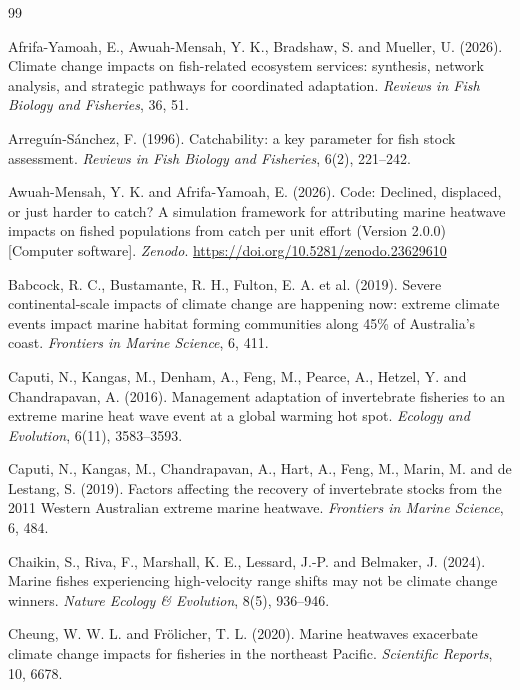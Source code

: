 \documentclass[11pt,a4paper]{article}
\begin{document}
\begin{thebibliography}{99}
\setlength{\itemsep}{2pt}

Afrifa-Yamoah, E., Awuah-Mensah, Y. K., Bradshaw, S. and Mueller, U. (2026). Climate change impacts on fish-related ecosystem services: synthesis, network analysis, and strategic pathways for coordinated adaptation. \textit{Reviews in Fish Biology and Fisheries}, 36, 51.

Arregu\'in-S\'anchez, F. (1996). Catchability: a key parameter for fish stock assessment. \textit{Reviews in Fish Biology and Fisheries}, 6(2), 221--242.

Awuah-Mensah, Y. K. and Afrifa-Yamoah, E. (2026). Code: Declined, displaced, or just harder to catch? A simulation framework for attributing marine heatwave impacts on fished populations from catch per unit effort (Version 2.0.0) [Computer software]. \textit{Zenodo}. \url{https://doi.org/10.5281/zenodo.23629610}

Babcock, R. C., Bustamante, R. H., Fulton, E. A. et al. (2019). Severe continental-scale impacts of climate change are happening now: extreme climate events impact marine habitat forming communities along 45\% of Australia's coast. \textit{Frontiers in Marine Science}, 6, 411.

Caputi, N., Kangas, M., Denham, A., Feng, M., Pearce, A., Hetzel, Y. and Chandrapavan, A. (2016). Management adaptation of invertebrate fisheries to an extreme marine heat wave event at a global warming hot spot. \textit{Ecology and Evolution}, 6(11), 3583--3593.

Caputi, N., Kangas, M., Chandrapavan, A., Hart, A., Feng, M., Marin, M. and de Lestang, S. (2019). Factors affecting the recovery of invertebrate stocks from the 2011 Western Australian extreme marine heatwave. \textit{Frontiers in Marine Science}, 6, 484.

Chaikin, S., Riva, F., Marshall, K. E., Lessard, J.-P. and Belmaker, J. (2024). Marine fishes experiencing high-velocity range shifts may not be climate change winners. \textit{Nature Ecology \& Evolution}, 8(5), 936--946.

Cheung, W. W. L. and Fr\"olicher, T. L. (2020). Marine heatwaves exacerbate climate change impacts for fisheries in the northeast Pacific. \textit{Scientific Reports}, 10, 6678.


\end{thebibliography}
\end{document}
